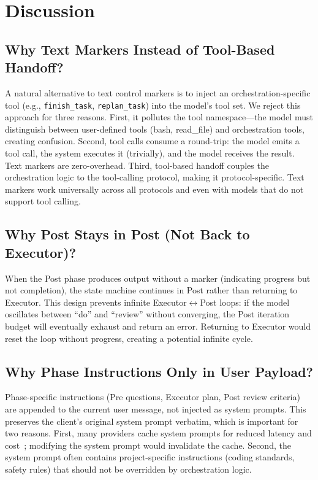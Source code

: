 \section{Discussion}
\label{sec:discussion}

\subsection{Why Text Markers Instead of Tool-Based Handoff?}

A natural alternative to text control markers is to inject an orchestration-specific tool (e.g., \texttt{finish\_task}, \texttt{replan\_task}) into the model's tool set. We reject this approach for three reasons. First, it pollutes the tool namespace---the model must distinguish between user-defined tools (bash, read\_file) and orchestration tools, creating confusion. Second, tool calls consume a round-trip: the model emits a tool call, the system executes it (trivially), and the model receives the result. Text markers are zero-overhead. Third, tool-based handoff couples the orchestration logic to the tool-calling protocol, making it protocol-specific. Text markers work universally across all protocols and even with models that do not support tool calling.

\subsection{Why Post Stays in Post (Not Back to Executor)?}

When the Post phase produces output without a marker (indicating progress but not completion), the state machine continues in Post rather than returning to Executor. This design prevents infinite Executor$\leftrightarrow$Post loops: if the model oscillates between ``do'' and ``review'' without converging, the Post iteration budget will eventually exhaust and return an error. Returning to Executor would reset the loop without progress, creating a potential infinite cycle.

\subsection{Why Phase Instructions Only in User Payload?}

Phase-specific instructions (Pre questions, Executor plan, Post review criteria) are appended to the current user message, not injected as system prompts. This preserves the client's original system prompt verbatim, which is important for two reasons. First, many providers cache system prompts for reduced latency and cost~\citep{anthropic_cache}; modifying the system prompt would invalidate the cache. Second, the system prompt often contains project-specific instructions (coding standards, safety rules) that should not be overridden by orchestration logic.

